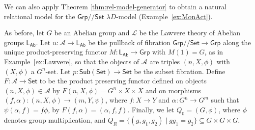 \documentclass[a4paper,UKenglish]{lipics}
\newcommand{\msf}[1]{\mathsf{#1}} %
\newcommand{\Grp}{\msf{Grp}}
\newcommand{\Set}{\msf{Set}}
\newcommand{\Sub}[1]{\msf{Sub}(#1)}
\newcommand{\LAb}{\msf{L}_{\msf{Ab}}}
\newcommand{\A}{\mathcal{A}}
\newcommand{\Lslice}[1]{#1/\!/\Set}
\newcommand{\GrpSet}{\Lslice{\Grp}}
\begin{document}
We can also apply Theorem \ref{thm:rel-model-generator} to obtain a natural relational model for the $\GrpSet$ $\lambda D$-model (Example~\ref{ex:MonAct}).

\begin{example}\label{ex:relMon}
As before, let $G$ be an Abelian group and $\mathcal{L}$ be the Lawvere theory of Abelian groups $\LAb$. Let $u:\A\to\LAb$ be the pullback of fibration $\GrpSet\to\Grp$ along the unique product-preserving functor $M:\LAb\to\Grp$ with $M(1)=G$, as in Example~\ref{ex:Lawvere}, so that the objects of $\A$ are triples $(n,X,\phi)$ with $(X,\phi)$ a $G^n$-set. Let $p:\Sub{\Set} \rightarrow \Set$ be the subset fibration. Define $F:\A\rightarrow \Set$ to be the product preserving functor defined on objects $(n,X,\phi) \in \A$ by $F(n,X, \phi) = G^{n} \times X \times X$ and on morphisms $(f, \alpha) : (n,X,\phi) \rightarrow (m, Y,\psi)$, where $f: X \rightarrow Y$ and $\alpha : G^n \rightarrow G^m$ such that $\psi (\alpha, f) = f \phi$, by $F(f,\alpha) = (\alpha, f, f)$. Finally, we let $Q_0 = (G,\phi)$, where $\phi$ denotes group multiplication, and $Q_R = \{(g,g_1,g_2) \mathrel| gg_1 = g_2 \} \subseteq G \times G \times G$.


\end{example}
\end{document}

